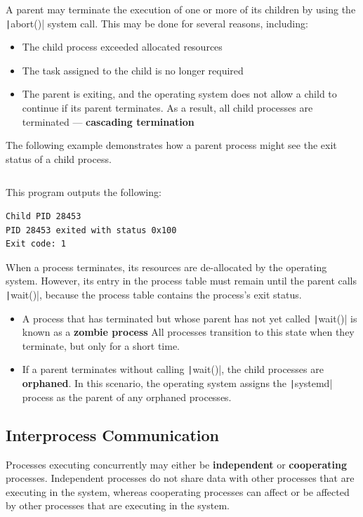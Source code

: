 \documentclass{article}
\begin{document}
A parent may terminate the execution of one or more of its children by
using the \texttt|abort()| system call. This may be done for
several reasons, including:
\begin{itemize}
    \item The child process exceeded allocated resources
    \item The task assigned to the child is no longer required
    \item The parent is exiting, and the operating system does not
          allow a child to continue if its parent terminates. As a
          result, all child processes are terminated ---
          \textbf{cascading termination}
\end{itemize}
The following
example demonstrates how a parent process might see the exit
status of a child process.
\inputminted{c}{code/terminate_process.c}
This program outputs the following:
\begin{verbatim}
Child PID 28453
PID 28453 exited with status 0x100
Exit code: 1
\end{verbatim}
When a process terminates, its resources are de-allocated by the
operating system. However, its entry in the process table must remain
until the parent calls \texttt|wait()|, because the process
table contains the process's exit status.
\begin{itemize}
    \item A process that has terminated but whose parent has not yet
          called \texttt|wait()| is known as a \textbf{zombie
          process} All processes transition to this state when they
          terminate, but only for a short time.
    \item If a parent terminates without calling
          \texttt|wait()|, the child processes are
          \textbf{orphaned}. In this scenario, the operating system
          assigns the \texttt|systemd| process as the parent
          of any orphaned processes.
\end{itemize}
\subsection{Interprocess Communication}
Processes executing concurrently may either be \textbf{independent} or
\textbf{cooperating} processes. Independent processes do not share data
with other processes that are executing in the system, whereas
cooperating processes can affect or be affected by other processes that
are executing in the system.
\end{document}
